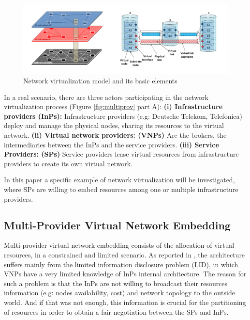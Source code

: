 \begin{figure}
  \centering
  	\includegraphics[scale=0.8]{gfx/networkvir.png}
  \caption{Network virtualization model and its basic elements}
  \label{fig:networkvir}
\end{figure}

In a real scenario, there are three actors participating in the network virtualization process (Figure \ref{fig:multiprov} part A): \newline
\textbf{ (i) Infrastructure providers (InPs):} Infrastructure providers (e.g: Deutsche Telekom, Telefonica) deploy and manage the physical nodes, sharing its resources to the virtual network. \newline
\textbf{ (ii) Virtual network providers: (VNPs)} Are the brokers, the intermediaries between the InPs and the service providers. \newline
\textbf{ (iii) Service Providers: (SPs)} Service providers lease virtual resources from infrastructure providers to create its own virtual network. 

In this paper a specific example of network virtualization will be investigated, where SPs are willing to embed resources among one or multiple infrastructure providers.


\subsection{Multi-Provider Virtual Network Embedding}

Multi-provider virtual network embedding consists of the allocation of virtual resources, in a constrained and limited scenario. As reported in \cite{dietrich2015multi}, the architecture suffers mainly from the limited information disclosure problem (LID), in which VNPs have a very limited knowledge of InPs internal architecture. The reason for such a problem is that the InPs are not willing to broadcast their resources information (e.g: nodes availability, cost) and network topology to the outside world. And if that was not enough, this information is crucial for the partitioning of resources in order to obtain a fair negotiation between the SPs and InPs. 

